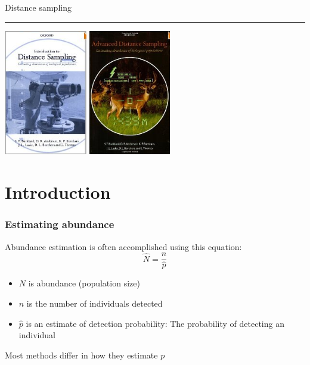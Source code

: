 \documentclass[color=usenames,dvipsnames,handout]{beamer}\usepackage[]{graphicx}\usepackage[]{xcolor}
\begin{document}
\begin{frame}[plain]
  \begin{center}
    {\huge Distance sampling \par}
    \vspace{0.5cm}
    {\color{RoyalBlue} \rule{\textwidth}{1pt}}
    \vfill
    \includegraphics[height=5.5cm,keepaspectratio]{figs/book1} %
    \hspace{0.5cm}
      \includegraphics[height=5.5cm,keepaspectratio,trim = 0mm
        0mm 0mm 0mm, clip]{figs/book2}
  \end{center}
\end{frame}




\section{Introduction}



\begin{frame}
  \frametitle{Estimating abundance}
  \large
  Abundance estimation is often accomplished using this equation:
  \[
    \hat{N} = \frac{n}{\hat{p}}
  \]
  \begin{itemize}
    \item $N$ is abundance (population size)
    \item $n$ is the number of individuals detected
    \item $\hat{p}$ is an estimate of detection probability: The probability
      of detecting an individual
  \end{itemize}
  \pause
  \vfill
  \centering
  Most methods differ in how they estimate $p$ \\
\end{frame}
\end{document}

